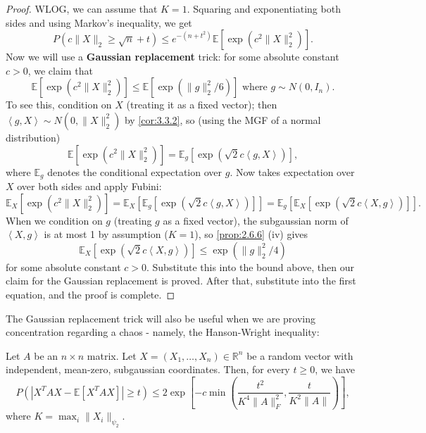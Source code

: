 \begin{proof}
WLOG, we can assume that $K = 1$. Squaring and exponentiating both sides and using Markov's inequality, we get 
\[ P(c \lVert X \rVert_{2} \geq \sqrt{n} + t) \leq e^{-(n + t^2)} \mathbb{E}\left[ \exp{(c^2 
\lVert X \rVert_{2}^2 )} \right]. \]
Now we will use a \textbf{Gaussian replacement} trick: for some absolute constant $c > 0$, we claim that 
\[ \mathbb{E}\left[ \exp{(c^2 \lVert X \rVert_{2}^2)} \right] \leq 
\mathbb{E}\left[ \exp{(\lVert g \rVert_{2}^2 / 6)} \right] \text{ where } g \sim N(0, I_n). \]
To see this, condition on $X$ (treating it as a fixed vector); then $\left\langle g, X \right\rangle \sim 
N(0, \lVert X \rVert_{2}^2)$ by \cref{cor:3.3.2}, so (using the MGF of a normal distribution)
\[ \mathbb{E}\left[ \exp{(c^2 \lVert X \rVert_{2}^2)} \right] = 
\mathbb{E}_g\left[ \exp{(\sqrt{2}c \left\langle g, X \right\rangle )} \right], \]
where $\mathbb{E}_g$ denotes the conditional expectation over $g$. Now takes expectation over $X$ over both 
sides and apply Fubini:
\[ \mathbb{E}_X\left[ \exp{(c^2 \lVert X \rVert_{2}^2)} \right] 
= \mathbb{E}_X\left[ \mathbb{E}_g\left[ \exp{(\sqrt{2}c \left\langle g, X \right\rangle )} \right] \right] 
= \mathbb{E}_g\left[ \mathbb{E}_X\left[ \exp{(\sqrt{2}c \left\langle X, g \right\rangle )} \right] \right]. \]
When we condition on $g$ (treating $g$ as a fixed vector), the subgaussian norm of $\left\langle X, g 
\right\rangle$ is at most 1 by assumption ($K = 1$), so \cref{prop:2.6.6} (iv) gives 
\[ \mathbb{E}_X\left[ \exp{(\sqrt{2}c \left\langle X, g \right\rangle )} \right] 
\leq \exp{(\lVert g \rVert_{2}^2 / 4)} \]
for some absolute constant $c > 0$. Substitute this into the bound above, then our claim for the Gaussian 
replacement is proved. After that, substitute into the first equation, and the proof is complete.
\end{proof}

The Gaussian replacement trick will also be useful when we are proving concentration regarding a chaos - namely, 
the Hanson-Wright inequality:
\begin{theorem}
\label{thm:6.2.2}
Let $A$ be an $n \times n$ matrix. Let $X = (X_1, \dots, X_n) \in \mathbb{R}^n$ be a random vector with 
independent, mean-zero, subgaussian coordinates. Then, for every $t \geq 0$, we have
\[ P(|X^TAX - \mathbb{E}\left[ X^TAX \right]| \geq t) \leq 
2 \exp{\left[ -c \min_{}\left( \frac{t^2}{K^4 \lVert A \rVert_{F}^2}, \frac{t}{K^2 \lVert A \rVert_{}} 
\right) \right]}, \]
where $K = \max_{i} \lVert X_i \rVert_{\psi_2}$.
\end{theorem}

